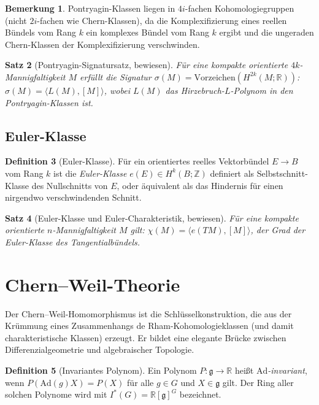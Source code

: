 \documentclass[12pt,a4paper]{amsart}
\newtheorem{theorem}{Satz}[section]
\theoremstyle{definition}
\newtheorem{definition}[theorem]{Definition}
\newtheorem{remark}[theorem]{Bemerkung}
\begin{document}
\begin{remark}
Pontryagin-Klassen liegen in $4i$-fachen Kohomologiegruppen (nicht $2i$-fachen
wie Chern-Klassen), da die Komplexifizierung eines reellen Bündels vom Rang $k$
ein komplexes Bündel vom Rang $k$ ergibt und die ungeraden Chern-Klassen der
Komplexifizierung verschwinden.
\end{remark}

\begin{theorem}[Pontryagin-Signatursatz, bewiesen]
\label{thm:signatur}
Für eine kompakte orientierte $4k$-Mannigfaltigkeit $M$ erfüllt die Signatur
$\sigma(M) = \mathrm{Vorzeichen}(H^{2k}(M;\mathbb{R}))$:
$\sigma(M) = \langle L(M), [M] \rangle$,
wobei $L(M)$ das Hirzebruch-$L$-Polynom in den Pontryagin-Klassen ist.
\end{theorem}

\subsection{Euler-Klasse}

\begin{definition}[Euler-Klasse]
Für ein orientiertes reelles Vektorbündel $E \to B$ vom Rang $k$ ist die
\emph{Euler-Klasse} $e(E) \in H^k(B;\mathbb{Z})$ definiert als
Selbstschnitt-Klasse des Nullschnitts von $E$, oder äquivalent als das
Hindernis für einen nirgendwo verschwindenden Schnitt.
\end{definition}

\begin{theorem}[Euler-Klasse und Euler-Charakteristik, bewiesen]
Für eine kompakte orientierte $n$-Mannigfaltigkeit $M$ gilt:
$\chi(M) = \langle e(TM), [M] \rangle$,
der Grad der Euler-Klasse des Tangentialbündels.
\end{theorem}

\section{Chern--Weil-Theorie}
\label{sec:chernweil}

Der Chern--Weil-Homomorphismus ist die Schlüsselkonstruktion, die aus der Krümmung
eines Zusammenhangs de Rham-Kohomologieklassen (und damit charakteristische Klassen)
erzeugt. Er bildet eine elegante Brücke zwischen Differenzialgeometrie und
algebraischer Topologie.

\begin{definition}[Invariantes Polynom]
Ein Polynom $P \colon \mathfrak{g} \to \mathbb{R}$ heißt
\emph{$\mathrm{Ad}$-invariant}, wenn
$P(\mathrm{Ad}(g) X) = P(X)$ für alle $g \in G$ und $X \in \mathfrak{g}$ gilt.
Der Ring aller solchen Polynome wird mit $I^*(G) = \mathbb{R}[\mathfrak{g}]^G$
bezeichnet.
\end{definition}
\end{document}
